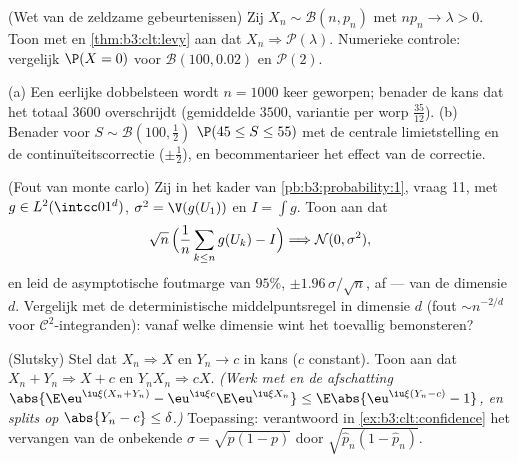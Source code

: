 \begin{exercise}[$\star\star$]\label{exo:b3:clt:5}
(Wet van de zeldzame gebeurtenissen) Zij $X_n \sim \mathcal B(n,
p_n)$ met $np_n \to \lambda > 0$. Toon met  en \cref{thm:b3:clt:levy} aan dat $X_n \Rightarrow
\mathcal P(\lambda)$. Numerieke controle: vergelijk $\P(X = 0)$
voor $\mathcal B(100, 0.02)$ en $\mathcal P(2)$.
\end{exercise}

\begin{exercise}[$\star\star$]\label{exo:b3:clt:6}
(a) Een eerlijke dobbelsteen wordt $n = 1000$ keer geworpen;
benader de kans dat het totaal $3600$ overschrijdt (gemiddelde
$3500$, variantie per worp $\frac{35}{12}$).
(b) Benader voor $S \sim \mathcal B(100, \frac12)$ $\P(45 \leq S
\leq 55)$ met de centrale limietstelling en de
continuïteitscorrectie ($\pm\frac12$), en becommentarieer het
effect van de correctie.
\end{exercise}

\begin{exercise}[$\star\star$]\label{exo:b3:clt:7}
(Fout van monte carlo) Zij in het kader van
\cref{pb:b3:probability:1}, vraag 11, met $g \in
L^2(\intcc01^d)$, $\sigma^2 = \V(g(U_1))$ en $I = \int g$. Toon
aan dat
\[
\sqrt n\,\Bigl(\frac1n\sum_{k\leq n}g(U_k) - I\Bigr)
\Longrightarrow \mathcal N(0, \sigma^2),
\]
en leid de asymptotische foutmarge van $95\%$, $\pm
1.96\,\sigma/\sqrt n$, af ---  van de dimensie $d$.
Vergelijk met de deterministische middelpuntsregel in dimensie
$d$ (fout $\sim n^{-2/d}$ voor $\mathcal C^2$-integranden): vanaf
welke dimensie wint het toevallig bemonsteren?
\end{exercise}

\begin{exercise}[$\star\star\star$]\label{exo:b3:clt:8}
(Slutsky) Stel dat $X_n \Rightarrow X$ en $Y_n \to c$ in kans
($c$ constant). Toon aan dat $X_n + Y_n \Rightarrow X + c$ en
$Y_nX_n \Rightarrow cX$. \emph{(Werk met 
en de afschatting $\abs{\E\eu^{\iu\xi (X_n+Y_n)} - \eu^{\iu\xi
c}\E\eu^{\iu\xi X_n}} \leq \E\abs{\eu^{\iu\xi(Y_n - c)} - 1}$, en
splits op $\abs{Y_n - c} \leq \delta$.)} Toepassing: verantwoord
in \cref{ex:b3:clt:confidence} het vervangen van de onbekende
$\sigma = \sqrt{p(1-p)}$ door $\sqrt{\hat p_n(1 - \hat p_n)}$.
\end{exercise}

